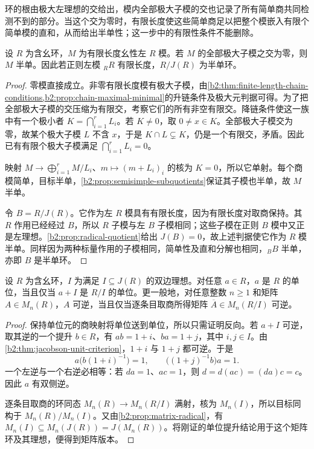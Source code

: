 环的根由极大左理想的交给出，模内全部极大子模的交也记录了所有简单商共同检测不到的部分。当这个交为零时，有限长度使这些简单商足以把整个模嵌入有限个简单模的直和，从而给出半单性；这一步中的有限性条件不能删除。

\begin{proposition}\label{b2:prop:finite-length-radical-zero}
	设 \(R\) 为含幺环，\(M\) 为有限长度幺性左 \(R\) 模。若 \(M\) 的全部极大子模之交为零，则 \(M\) 半单。因此若正则左模 \({}_RR\) 有限长度，\(R/J(R)\) 为半单环。
\end{proposition}
\begin{proof}
	零模直接成立。非零有限长度模有极大子模，由\cref{b2:thm:finite-length-chain-conditions,b2:prop:chain-maximal-minimal}的升链条件及极大元判据可得。为了把全部极大子模的交压缩为有限交，考察它们的所有非空有限交。降链条件使这一族中有一个极小者 \(K=\bigcap_{i=1}^r L_i\)。若 \(K\ne0\)，取 \(0\ne x\in K\)。全部极大子模交为零，故某个极大子模 \(L\) 不含 \(x\)，于是 \(K\cap L\subsetneq K\)，仍是一个有限交，矛盾。因此已有有限个极大子模满足 \(\bigcap_{i=1}^rL_i=0\)。

	映射 \(M\to\bigoplus_{i=1}^rM/L_i\)、\(m\mapsto(m+L_i)_i\) 的核为 \(K=0\)，所以它单射。每个商模简单，目标半单，\cref{b2:prop:semisimple-subquotients}保证其子模也半单，故 \(M\) 半单。

	令 \(B=R/J(R)\)。它作为左 \(R\) 模具有有限长度，因为有限长度对取商保持。其 \(R\) 作用已经经过 \(B\)，所以 \(R\) 子模与左 \(B\) 子模相同；这些子模在正则 \(B\) 模中又正是左理想。\cref{b2:prop:radical-quotient}给出 \(J(B)=0\)，故上述判据使它作为 \(R\) 模半单。同样因为两种标量作用的子模相同，简单性及直和分解也相同，\({}_BB\) 半单，亦即 \(B\) 是半单环。
\end{proof}

\begin{corollary}[单位的提升]\label{b2:cor:units-lift-radical}
	设 \(R\) 为含幺环，\(I\) 为满足 \(I\subseteq J(R)\) 的双边理想。对任意 \(a\in R\)，\(a\) 是 \(R\) 的单位，当且仅当 \(a+I\) 是 \(R/I\) 的单位。更一般地，对任意整数 \(n\ge1\) 和矩阵 \(A\in M_n(R)\)，\(A\) 可逆，当且仅当逐条目取商所得矩阵 \(\overline A\in M_n(R/I)\) 可逆。
\end{corollary}
\begin{proof}
	保持单位元的商映射将单位送到单位，所以只需证明反向。若 \(a+I\) 可逆，取其逆的一个提升 \(b\in R\)，有 \(ab=1+i\)、\(ba=1+j\)，其中 \(i,j\in I\)。由\cref{b2:thm:jacobson-unit-criterion}，\(1+i\) 与 \(1+j\) 都可逆。于是
	\[
		a\bigl(b(1+i)^{-1}\bigr)=1, \qquad \bigl((1+j)^{-1}b\bigr)a=1.
	\]
	一个左逆与一个右逆必相等：若 \(da=1\)、\(ac=1\)，则 \(d=d(ac)=(da)c=c\)。因此 \(a\) 有双侧逆。

	逐条目取商的环同态 \(M_n(R)\to M_n(R/I)\) 满射，核为 \(M_n(I)\)，所以目标同构于 \(M_n(R)/M_n(I)\)。又由\cref{b2:prop:matrix-radical}，有 \(M_n(I)\subseteq M_n(J(R))=J(M_n(R))\)。将刚证的单位提升结论用于这个矩阵环及其理想，便得到矩阵版本。
\end{proof}

